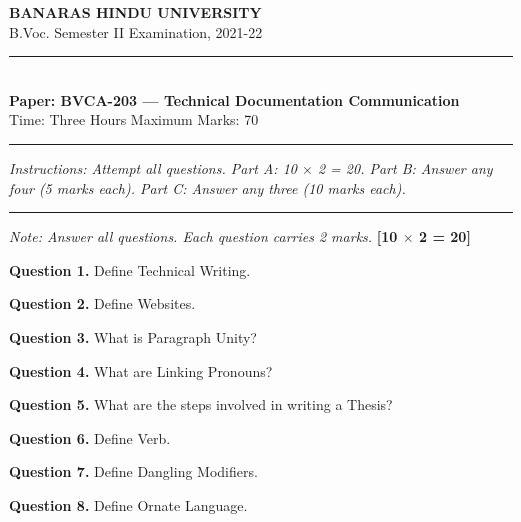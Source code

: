 \documentclass[11pt,a4paper]{article}
\begin{document}
\begin{center}
  {\large\bfseries BANARAS HINDU UNIVERSITY}\\[2pt]
  {\normalsize B.Voc. Semester II Examination, 2021-22}\\[6pt]
  \rule{0.8\linewidth}{0.5pt}\\[6pt]
  {\large\bfseries Paper: BVCA-203 --- Technical Documentation Communication}\\[4pt]
  {\normalsize Time: Three Hours \hfill Maximum Marks: 70}
\end{center}

\rule{\linewidth}{0.4pt}

\smallskip
\smallskip



\noindent   \textit{Instructions: Attempt all questions. Part A: 10 $ \times$ 2 = 20. Part B: Answer any four (5 marks each). Part C: Answer any three (10 marks each).}

\bigskip

\bigskip


\rule{\linewidth}{0.4pt}\smallskip




\noindent   \textit{Note: Answer all questions. Each question carries 2 marks.} \hfill   \textbf{[10 $ \times$ 2 = 20]}

\medskip


\noindent   \textbf{Question 1.} Define Technical Writing.

\medskip


\noindent   \textbf{Question 2.} Define Websites.

\medskip


\noindent   \textbf{Question 3.} What is Paragraph Unity?

\medskip


\noindent   \textbf{Question 4.} What are Linking Pronouns?

\medskip


\noindent   \textbf{Question 5.} What are the steps involved in writing a Thesis?

\medskip


\noindent   \textbf{Question 6.} Define Verb.

\medskip


\noindent   \textbf{Question 7.} Define Dangling Modifiers.

\medskip


\noindent   \textbf{Question 8.} Define Ornate Language.
\end{document}
